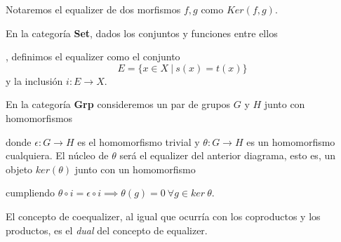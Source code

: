 Notaremos el equalizer de dos morfismos $f,g$ como $Ker(f,g)$.

\begin{ejemplo}
    En la categoría \textbf{Set}, dados los conjuntos y funciones entre ellos , definimos el equalizer como el conjunto \begin{equation}
        E = \{x \in X \ | \ s(x) = t(x)\}
    \end{equation} y la inclusión $i: E \longrightarrow X$. 
\end{ejemplo}

\begin{ejemplo}
    En la categoría \textbf{Grp} consideremos un par de grupos $G$ y $H$ junto con homomorfismos  donde $\epsilon: G \longrightarrow H$ es el homomorfismo trivial y $\theta: G \longrightarrow H$ es un homomorfismo cualquiera. El núcleo de $\theta$ será el equalizer del anterior diagrama, esto es, un objeto $ker (\theta)$ junto con un homomorfismo  cumpliendo $\theta \circ i = \epsilon \circ i \implies \theta(g) = 0 \ \forall g \in ker \ \theta $.
\end{ejemplo}

El concepto de coequalizer, al igual que ocurría con los coproductos y los productos, es el \textit{dual} del concepto de equalizer.

